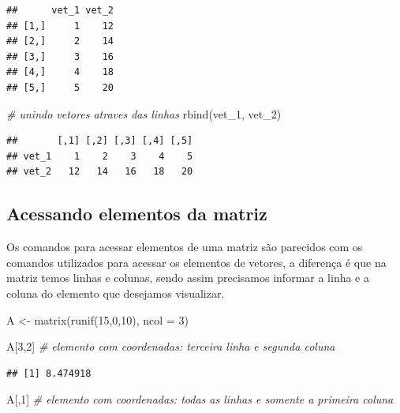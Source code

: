 \documentclass[
]{book}
\newenvironment{Shaded}{\begin{snugshade}}{\end{snugshade}}
\newcommand{\AttributeTok}[1]{\textcolor[rgb]{0.77,0.63,0.00}{#1}}
\newcommand{\CommentTok}[1]{\textcolor[rgb]{0.56,0.35,0.01}{\textit{#1}}}
\newcommand{\DecValTok}[1]{\textcolor[rgb]{0.00,0.00,0.81}{#1}}
\newcommand{\FunctionTok}[1]{\textcolor[rgb]{0.00,0.00,0.00}{#1}}
\newcommand{\NormalTok}[1]{#1}
\newcommand{\OtherTok}[1]{\textcolor[rgb]{0.56,0.35,0.01}{#1}}
\begin{document}
\begin{verbatim}
##      vet_1 vet_2
## [1,]     1    12
## [2,]     2    14
## [3,]     3    16
## [4,]     4    18
## [5,]     5    20
\end{verbatim}

\begin{Shaded}
\begin{Highlighting}[]
\CommentTok{\# unindo vetores atraves das linhas}
\FunctionTok{rbind}\NormalTok{(vet\_1, vet\_2)}
\end{Highlighting}
\end{Shaded}

\begin{verbatim}
##       [,1] [,2] [,3] [,4] [,5]
## vet_1    1    2    3    4    5
## vet_2   12   14   16   18   20
\end{verbatim}

\hypertarget{acessando-elementos-da-matriz}{%
\subsection{Acessando elementos da matriz}\label{acessando-elementos-da-matriz}}

Os comandos para acessar elementos de uma matriz são parecidos com os comandos utilizados para acessar os elementos de vetores, a diferença é que na matriz temos linhas e colunas, sendo assim precisamos informar a linha e a coluna do elemento que desejamos visualizar.

\begin{Shaded}
\begin{Highlighting}[]
\NormalTok{A }\OtherTok{\textless{}{-}} \FunctionTok{matrix}\NormalTok{(}\FunctionTok{runif}\NormalTok{(}\DecValTok{15}\NormalTok{,}\DecValTok{0}\NormalTok{,}\DecValTok{10}\NormalTok{), }\AttributeTok{ncol =} \DecValTok{3}\NormalTok{)}

\NormalTok{A[}\DecValTok{3}\NormalTok{,}\DecValTok{2}\NormalTok{] }\CommentTok{\# elemento com coordenadas: terceira linha  e segunda coluna}
\end{Highlighting}
\end{Shaded}

\begin{verbatim}
## [1] 8.474918
\end{verbatim}

\begin{Shaded}
\begin{Highlighting}[]
\NormalTok{A[,}\DecValTok{1}\NormalTok{] }\CommentTok{\# elemento com coordenadas: todas as linhas e somente a primeira coluna}
\end{Highlighting}
\end{Shaded}
\end{document}
